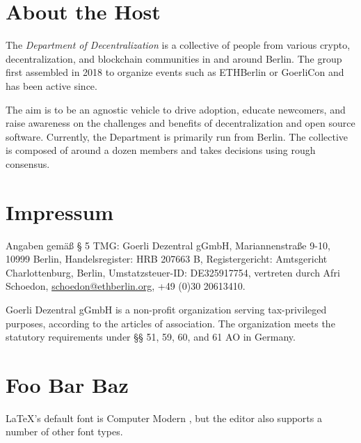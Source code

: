 \documentclass[a4paper,12pt]{article}
\begin{document}
  \section{About the Host}
  The \textit{Department of Decentralization} \cite{dod} is a collective of people from various
  crypto, decentralization, and blockchain communities in and around Berlin. The group first
  assembled in 2018 to organize events such as ETHBerlin \cite{ethberlin} or GoerliCon
  \cite{goerli} and has been active since.

  The aim is to be an agnostic vehicle to drive adoption, educate newcomers, and raise awareness
  on the challenges and benefits of decentralization and open source software. Currently, the
  Department is primarily run from Berlin. The collective is composed of around a dozen members
  and takes decisions using rough consensus.

  \section{Impressum}
  Angaben gemäß § 5 TMG: Goerli Dezentral gGmbH, Mariannenstraße 9-10, 10999 Berlin,
  Handelsregister: HRB 207663 B, Registergericht: Amtsgericht Charlottenburg, Berlin,
  Umstatzsteuer-ID: DE325917754, vertreten durch Afri Schoedon, \url{schoedon@ethberlin.org},
  +49 (0)30 20613410.

  Goerli Dezentral gGmbH is a non-profit organization serving tax-privileged
  purposes, according to the articles of association. The organization meets the statutory
  requirements under §§ 51, 59, 60, and 61 AO in Germany.

  \section{Foo Bar Baz}
  \LaTeX's default font is Computer Modern \cite{font}, but the editor also supports a
  number of other font types.

  \printbibliography
\end{document}
